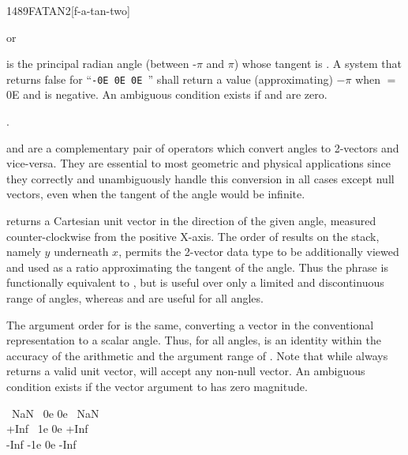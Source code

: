 
\begin{worddef}{1489}{FATAN2}[f-a-tan-two]
\item {} or

	 is the principal radian angle (between -$\pi$ and $\pi$)
	whose tangent is .
	A system that returns false for ``\texttt{-0E 0E 0E }''
	shall return a value (approximating) $-\pi$ when  $=$ 0E
	and  is negative.
	An ambiguous condition exists if  and  are
	zero.

\see {}.

	\begin{rationale} %
		 and  are a complementary pair of
		operators which convert angles to 2-vectors and vice-versa.
		They are essential to most geometric and physical applications
		since they correctly and unambiguously handle this conversion
		in all cases except null vectors, even when the tangent of the
		angle would be infinite.

		 returns a Cartesian unit vector in the direction
		of the given angle, measured counter-clockwise from the positive
		X-axis. The order of results on the stack, namely $y$ underneath
		$x$, permits the 2-vector data type to be additionally viewed
		and used as a ratio approximating the tangent of the angle.
		Thus the phrase   is functionally
		equivalent to , but is useful over only a limited
		and discontinuous range of angles, whereas  and
		 are useful for all angles.

		The argument order for  is the same, converting a
		vector in the conventional representation to a scalar angle.
		Thus, for all angles,   is an identity
		within the accuracy of the arithmetic and the argument range of
		. Note that while  always returns a
		valid unit vector,  will accept any non-null vector.
		An ambiguous condition exists if the vector argument to
		 has zero magnitude.
	\end{rationale}

	\begin{testing}\ttfamily
		\word[tools]{[UNDEFINED]} ~NaN \word[tools]{[IF]} ~0e 0e   ~NaN \word[tools]{[THEN]} \\
		\word[tools]{[UNDEFINED]} +Inf \word[tools]{[IF]} ~1e 0e   +Inf \word[tools]{[THEN]} \\
		\word[tools]{[UNDEFINED]} -Inf \word[tools]{[IF]} -1e 0e   -Inf \word[tools]{[THEN]}


\end{testing}
\end{worddef}

